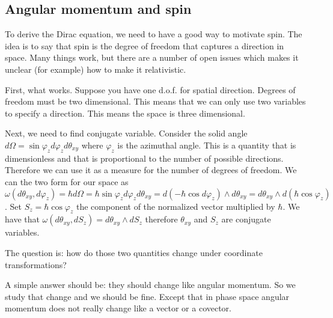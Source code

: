 \documentclass[11pt,letterpaper,fleqn]{memoir} %
\begin{document}
\subsection{Angular momentum and spin}

To derive the Dirac equation, we need to have a good way to motivate spin. The idea is to say that spin is the degree of freedom that captures a direction in space. Many things work, but there are a number of open issues which makes it unclear (for example) how to make it relativistic.

First, what works. Suppose you have one d.o.f. for spatial direction. Degrees of freedom must be two dimensional. This means that we can only use two variables to specify a direction. This means the space is three dimensional.

Next, we need to find conjugate variable. Consider the solid angle $d\Omega=\sin \varphi_z d\varphi_z d\theta_{xy}$ where $\varphi_z$ is the azimuthal angle. This is a quantity that is dimensionless and that is proportional to the number of possible directions. Therefore we can use it as a measure for the number of degrees of freedom. We can the two form for our space as $\omega(d\theta_{xy}, d\varphi_z) = \hbar d\Omega = \hbar\sin \varphi_z d\varphi_z d\theta_{xy} = d(- \hbar \cos d\varphi_z ) \wedge d\theta_{xy} = d\theta_{xy} \wedge d(\hbar \cos \varphi_z )$. Set $S_z= \hbar \cos \varphi_z$ the component of the normalized vector multiplied by $\hbar$. We have that $\omega(d\theta_{xy}, dS_z) = d\theta_{xy} \wedge dS_z$ therefore $\theta_{xy}$ and $S_z$ are conjugate variables.

The question is: how do those two quantities change under coordinate transformations?

A simple answer should be: they should change like angular momentum. So we study that change and we should be fine. Except that in phase space angular momentum does not really change like a vector or a covector.
\end{document}

